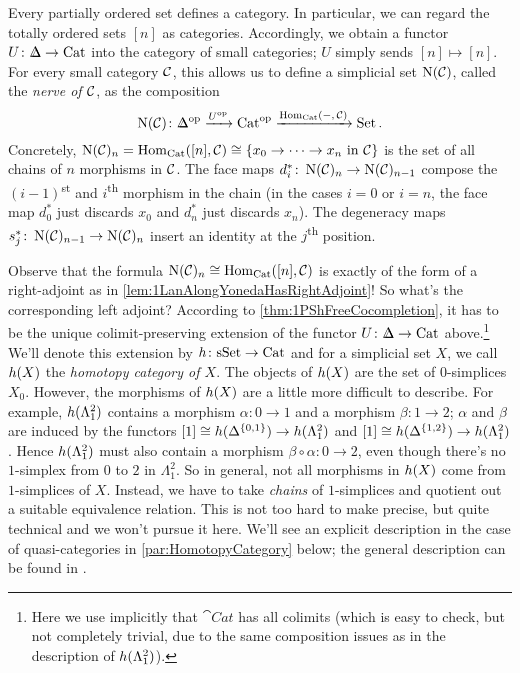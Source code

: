 \begin{numpar}\label{par:Nerve}
	Every partially ordered set defines a category. In particular, we can regard the totally ordered sets $[n]$ as categories. Accordingly, we obtain a functor $U\colon \IDelta\rightarrow \cat{Cat}$ into the category of small categories; $U$ simply sends $[n]\mapsto [n]$. For every small category $\mathcal{C}$, this allows us to define a simplicial set $\operatorname{N}(\mathcal{C})$, called the \emph{nerve of $\mathcal{C}$}, as the composition
	\begin{equation*}
		\N(\Cc)\colon \IDelta^\op\xrightarrow{U^\op}\cat{Cat}^\op\xrightarrow{\Hom_{\cat{Cat}}(-,\,\Cc)}\cat{Set}\,.
	\end{equation*}
	Concretely, $\operatorname{N}(\mathcal{C})_n= \operatorname{Hom}_{\mathrm{Cat}}([n],\mathcal{C})\cong \{x_0\rightarrow \dotsb\rightarrow x_n\text{ in $\mathcal{C}$}\}$ is the set of all chains of $n$ morphisms in $\mathcal{C}$. The face maps $d_i^*\colon \operatorname{N}(\mathcal{C})_n\rightarrow \operatorname{N}(\mathcal{C})_{n-1}$ compose the $(i-1)$\textsuperscript{st} and $i$\textsuperscript{th} morphism in the chain (in the cases $i=0$ or $i=n$, the face map $d_0^*$ just discards $x_0$ and $d_n^*$ just discards $x_n$). The degeneracy maps $s_j^*\colon \operatorname{N}(\mathcal{C})_{n-1}\rightarrow \operatorname{N}(\mathcal{C})_n$ insert an identity at the $j$\textsuperscript{th} position.
	
	Observe that the formula $\operatorname{N}(\mathcal{C})_n\cong\operatorname{Hom}_{\mathrm{Cat}}([n],\mathcal{C})$ is exactly of the form of a right-adjoint as in \cref{lem:1LanAlongYonedaHasRightAdjoint}! So what's the corresponding left adjoint? According to \cref{thm:1PShFreeCocompletion}, it has to be the unique colimit-preserving extension of the functor $U\colon\IDelta\rightarrow \cat{Cat}$ above.\footnote{Here we use implicitly that $\cat{Cat}$ has all colimits (which is easy to check, but not completely trivial, due to the same composition issues as in the description of $h(\Lambda_1^2)$).} We'll denote this extension by $h\colon \mathrm{sSet}\rightarrow\mathrm{Cat}$ and for a simplicial set $X$, we call $h(X)$ the \emph{homotopy category of $X$}. The objects of $h(X)$ are the set of $0$-simplices $X_0$. However, the morphisms of $h(X)$ are a little more difficult to describe. For example, $h(\Lambda_1^2)$ contains a morphism $\alpha\colon 0\rightarrow 1$ and a morphism $\beta\colon 1\rightarrow 2$; $\alpha$ and $\beta$ are induced by the functors $[1]\cong h(\Delta^{\{0,1\}})\rightarrow h(\Lambda_1^2)$ and $[1]\cong h(\Delta^{\{1,2\}})\rightarrow h(\Lambda_1^2)$. Hence $h(\Lambda_1^2)$ must also contain a morphism $\beta\circ\alpha\colon 0\rightarrow 2$, even though there's no $1$-simplex from $0$ to $2$ in $\Lambda_1^2$. So in general, not all morphisms in $h(X)$ come from $1$-simplices of $X$. Instead, we have to take \emph{chains} of $1$-simplices and quotient out a suitable equivalence relation. This is not too hard to make precise, but quite technical and we won't pursue it here. We'll see an explicit description in the case of quasi-categories in \cref{par:HomotopyCategory} below; the general description can be found in \cite[Construction/Proposition~II.24]{HigherCatsI}.
\end{numpar}

